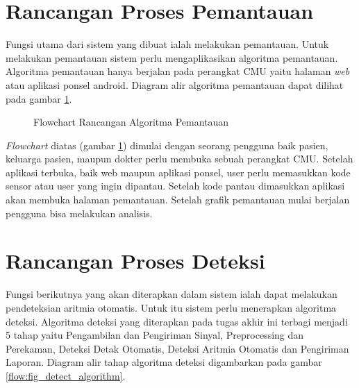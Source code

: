 \section{Rancangan Proses Pemantauan} \label{ssec:algorithm_design_1}
Fungsi utama dari sistem yang dibuat ialah melakukan pemantauan. Untuk melakukan pemantauan sistem perlu mengaplikasikan algoritma pemantauan. Algoritma pemantauan hanya berjalan pada perangkat CMU yaitu halaman \textit{web} atau aplikasi ponsel android. Diagram alir algoritma pemantauan dapat dilihat pada gambar \ref{flow:fig_report_algorithm}.
\begin{figure}[H]
	\centering
    \caption{Flowchart Rancangan Algoritma Pemantauan}
	\label{flow:fig_report_algorithm}
\end{figure}

\textit{Flowchart} diatas (gambar \ref{flow:fig_report_algorithm}) dimulai dengan seorang pengguna baik pasien, keluarga pasien, maupun dokter perlu membuka sebuah perangkat CMU. Setelah aplikasi terbuka, baik web maupun aplikasi ponsel, user perlu memasukkan kode sensor atau user yang ingin dipantau. Setelah kode pantau dimasukkan aplikasi akan membuka halaman pemantauan. Setelah grafik pemantauan mulai berjalan pengguna bisa melakukan analisis.

\section{Rancangan Proses Deteksi} \label{ssec:algorithm_design_2}
Fungsi berikutnya yang akan diterapkan dalam sistem ialah dapat melakukan pendeteksian aritmia otomatis. Untuk itu sistem perlu menerapkan algoritma deteksi. Algoritma deteksi yang diterapkan pada tugas akhir ini terbagi menjadi 5 tahap yaitu Pengambilan dan Pengiriman Sinyal, Preprocessing dan Perekaman, Deteksi Detak Otomatis, Deteksi Aritmia Otomatis dan Pengiriman Laporan. Diagram alir tahap algoritma deteksi digambarkan pada gambar \ref{flow:fig_detect_algorithm}.

